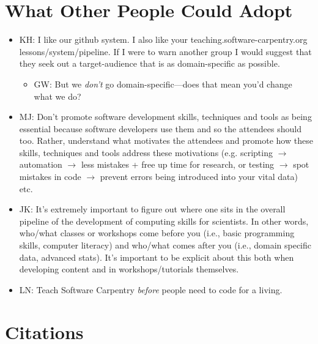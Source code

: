 \documentclass{article}
\begin{document}
\section{What Other People Could Adopt}

\begin{itemize}

  \item KH: I like our github system. I also like your teaching.software-carpentry.org lessons/system/pipeline. If I were to warn another group I would suggest that they seek out a target-audience that is as domain-specific as possible.
    \begin{itemize}
      \item GW: But we \emph{don't} go domain-specific---does that mean you'd change what we do?
    \end{itemize}

  \item MJ: Don't promote software development skills, techniques and tools as being essential because software developers use them and so the attendees should too. Rather, understand what motivates the attendees and promote how these skills, techniques and tools address these motivations (e.g. scripting $\rightarrow$ automation $\rightarrow$ less mistakes + free up time for research, or testing $\rightarrow$ spot mistakes in code $\rightarrow$ prevent errors being introduced into your vital data) etc.

  \item JK: It's extremely important to figure out where one sits in the overall pipeline of the development of computing skills for scientists. In other words, who/what classes or workshops come before you (i.e., basic programming skills, computer literacy) and who/what comes after you (i.e., domain specific data, advanced stats). It's important to be explicit about this both when developing content and in workshops/tutorials themselves.

  \item LN: Teach Software Carpentry \emph{before} people need to code for a living.

\end{itemize}

\section{Citations}

\cite{hannay2009}
\cite{prabhu2011}
\cite{wilson1996}
\cite{wilson2006a}
\cite{wilson2006b}
\cite{wilson2009}



\end{document}
